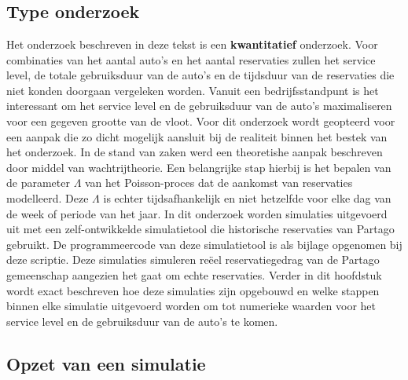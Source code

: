 
\chapter{}
\label{ch:methodologie}

\section{Type onderzoek}
Het onderzoek beschreven in deze tekst is een \textbf{kwantitatief} onderzoek. Voor combinaties van het aantal auto's en het aantal reservaties zullen het service level, de totale gebruiksduur van de auto's en de tijdsduur van de reservaties die niet konden doorgaan vergeleken worden. Vanuit een bedrijfsstandpunt is het interessant om het service level en de gebruiksduur van de auto's maximaliseren voor een gegeven grootte van de vloot. Voor dit onderzoek wordt geopteerd voor een aanpak die zo dicht mogelijk aansluit bij de realiteit binnen het bestek van het onderzoek. In de stand van zaken werd een theoretishe aanpak beschreven door middel van wachtrijtheorie. Een belangrijke stap hierbij is het bepalen van de parameter $\Lambda$ van het Poisson-proces dat de aankomst van reservaties modelleerd. Deze $\Lambda$ is echter tijdsafhankelijk en niet hetzelfde voor elke dag van de week of periode van het jaar. In dit onderzoek worden simulaties uitgevoerd uit met een zelf-ontwikkelde simulatietool die historische reservaties van Partago gebruikt. De programmeercode van deze simulatietool is als bijlage opgenomen bij deze scriptie. Deze simulaties simuleren reëel reservatiegedrag van de Partago gemeenschap aangezien het gaat om echte reservaties. Verder in dit hoofdstuk wordt exact beschreven hoe deze simulaties zijn opgebouwd en welke stappen binnen elke simulatie uitgevoerd worden om tot numerieke waarden voor het service level en de gebruiksduur van de auto's te komen. 

\section{Opzet van een simulatie}
